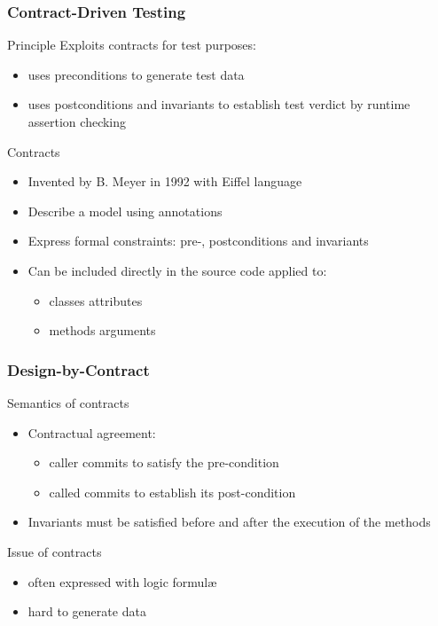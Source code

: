 \documentclass[9pt]{beamer}
\begin{document}
\begin{frame}
\frametitle{Contract-Driven Testing}

\begin{block}{Principle}
Exploits contracts for test purposes:
\begin{itemize}
\item uses preconditions to generate test data
\item uses postconditions and invariants to establish test verdict by runtime
assertion
checking
\end{itemize}
\end{block}

\begin{block}{Contracts}
\begin{itemize}
\item Invented by B. Meyer in 1992 with Eiffel language
\item Describe a model using annotations
\item Express formal constraints: pre-, postconditions and invariants
\item Can be included directly in the source code applied to:
  \begin{itemize}
  \item classes attributes
  \item methods arguments
  \end{itemize}
\end{itemize}
\end{block}

\end{frame}

\begin{frame}
\frametitle{Design-by-Contract}

\begin{block}{Semantics of contracts}
\begin{itemize}
\item Contractual agreement:
  \begin{itemize}
  \item caller commits to satisfy the pre-condition
  \item called commits to establish its post-condition
  \end{itemize}
\item Invariants must be satisfied before and after the execution of the methods
\end{itemize}
\end{block}


\begin{block}{Issue of contracts}
\begin{itemize}
\item often expressed with logic formulæ
\item hard to generate data
\end{itemize}
\end{block}

\end{frame}
\end{document}
